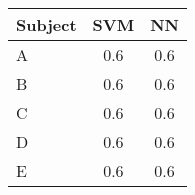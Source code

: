 \begin{tabular}{l c c}
\toprule
Subject	& SVM & NN \\
\midrule
A	& 0.6 & 0.6 \\
B	& 0.6 & 0.6 \\
C	& 0.6 & 0.6 \\
D	& 0.6 & 0.6 \\
E	& 0.6 & 0.6 \\
\bottomrule 
\end{tabular}